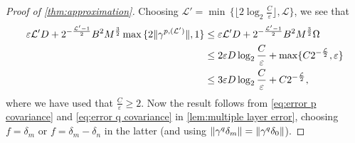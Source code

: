 \documentclass[submission, Phys]{SciPost}
\theoremstyle{definition}
\theoremstyle{remark}
\DeclarePairedDelimiter{\norm}{\lVert}{\rVert}
\newcommand{\eps}{\varepsilon}
\newcommand{\cL}{\mathcal L}
\newcommand{\wnorm}{D}
\begin{document}
\begin{appendix}
\begin{proof}[Proof of \cref{thm:approximation}]
Choosing
$\cL' = \min \, \{ \lfloor 2 \log_2 \frac{C}{\eps}\rfloor , \cL \}$,
we see that
\begin{equation*}\begin{aligned}
  \eps \cL' \wnorm + 2^{-\frac{\cL'-1}2} B^2 M^{\frac32} \max \, \{ 2\norm{\gamma^{p,(\cL')}}, 1 \}
  &\leq \eps \cL' \wnorm + 2^{-\frac{\cL'-1}2} B^2 M^{\frac32} \Omega \\
  &\leq 2\eps \wnorm \log_2 \frac{C}{\eps} + \max\{C2^{-\frac{\cL}2}, \eps\} \\
  &\leq 3\eps \wnorm \log_2 \frac{C}{\eps} + C2^{-\frac{\cL}2},
\end{aligned}\end{equation*}
where we have used that $\frac{C}{\eps} \geq 2$.
Now the result follows from \cref{eq:error p covariance} and \cref{eq:error q covariance} in \cref{lem:multiple layer error}, choosing $f = \delta_m$ or $f = \delta_m - \delta_n$ in the latter (and using $\norm{\gamma^q \delta_m} = \norm{\gamma^q \delta_0}$).
\end{proof}


\end{appendix}
\end{document}
